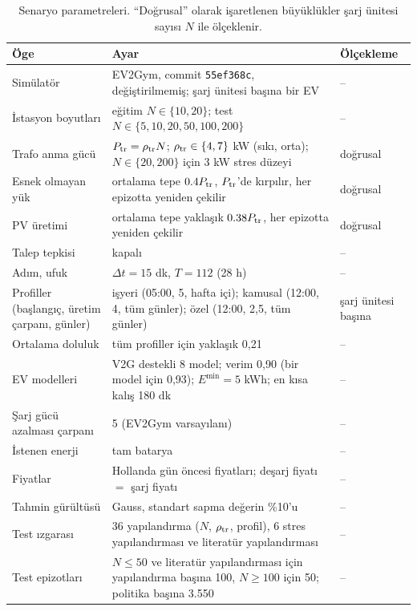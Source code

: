 \begin{table}[t]
\centering
\caption{Senaryo parametreleri. ``Doğrusal'' olarak işaretlenen büyüklükler şarj ünitesi sayısı $N$ ile ölçeklenir.}
\label{tab:scenarios}
\footnotesize
\setlength{\tabcolsep}{4pt}
\begin{tabular}{@{}>{\raggedright}p{3.4cm}>{\raggedright}p{9.6cm}l@{}}
\toprule
Öge & Ayar & Ölçekleme \\
\midrule
Simülatör & EV2Gym, commit \texttt{55ef368c}, değiştirilmemiş; şarj ünitesi başına bir EV & -- \\
İstasyon boyutları & eğitim $N\in\{10,20\}$; test $N\in\{5,10,20,50,100,200\}$ & -- \\
Trafo anma gücü & $P_{\mathrm{tr}}=\rho_{\mathrm{tr}}N$; $\rho_{\mathrm{tr}}\in\{4,7\}$ kW (sıkı, orta); $N\in\{20,200\}$ için 3 kW stres düzeyi & doğrusal \\
Esnek olmayan yük & ortalama tepe $0.4P_{\mathrm{tr}}$, $P_{\mathrm{tr}}$'de kırpılır, her epizotta yeniden çekilir & doğrusal \\
PV üretimi & ortalama tepe yaklaşık $0.38P_{\mathrm{tr}}$, her epizotta yeniden çekilir & doğrusal \\
Talep tepkisi & kapalı & -- \\
Adım, ufuk & $\Delta t=15$ dk, $T=112$ (28 h) & -- \\
Profiller (başlangıç, üretim çarpanı, günler) & işyeri (05:00, 5, hafta içi); kamusal (12:00, 4, tüm günler); özel (12:00, 2,5, tüm günler) & şarj ünitesi başına \\
Ortalama doluluk & tüm profiller için yaklaşık 0,21 & -- \\
EV modelleri & V2G destekli 8 model; verim 0,90 (bir model için 0,93); $E^{\min}=5$ kWh; en kısa kalış 180 dk & -- \\
Şarj gücü azalması çarpanı & 5 (EV2Gym varsayılanı) & -- \\
İstenen enerji & tam batarya & -- \\
Fiyatlar & Hollanda gün öncesi fiyatları; deşarj fiyatı $=$ şarj fiyatı & -- \\
Tahmin gürültüsü & Gauss, standart sapma değerin \%10'u & -- \\
Test ızgarası & 36 yapılandırma ($N$, $\rho_{\mathrm{tr}}$, profil), 6 stres yapılandırması ve literatür yapılandırması & -- \\
Test epizotları & $N\le50$ ve literatür yapılandırması için yapılandırma başına 100, $N\ge100$ için 50; politika başına 3.550 & -- \\
\bottomrule
\end{tabular}
\end{table}

